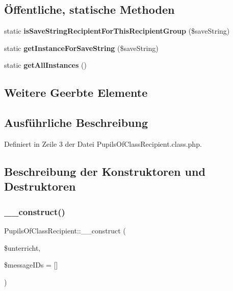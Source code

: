 \subsection*{Öffentliche, statische Methoden}
\begin{DoxyCompactItemize}
\item 
\mbox{\label{class_pupils_of_class_recipient_ac2c80b847ff2d2d83e6e86a42657c5c5}} 
static {\bfseries is\+Save\+String\+Recipient\+For\+This\+Recipient\+Group} (\$save\+String)
\item 
\mbox{\label{class_pupils_of_class_recipient_a70c289886a562779a58fe30073057821}} 
static {\bfseries get\+Instance\+For\+Save\+String} (\$save\+String)
\item 
\mbox{\label{class_pupils_of_class_recipient_a4021c58ee0419c037de108ea415a2cef}} 
static {\bfseries get\+All\+Instances} ()
\end{DoxyCompactItemize}
\subsection*{Weitere Geerbte Elemente}


\subsection{Ausführliche Beschreibung}


Definiert in Zeile 3 der Datei Pupils\+Of\+Class\+Recipient.\+class.\+php.



\subsection{Beschreibung der Konstruktoren und Destruktoren}
\mbox{\label{class_pupils_of_class_recipient_a46ee50b00da193e1a20ed36d226703af}} 
\subsubsection{\texorpdfstring{\+\_\+\+\_\+construct()}{\_\_construct()}}
{\footnotesize\ttfamily Pupils\+Of\+Class\+Recipient\+::\+\_\+\+\_\+construct (\begin{DoxyParamCaption}\item[{}]{\$unterricht,  }\item[{}]{\$message\+I\+Ds = {\ttfamily \mbox{[}\mbox{]}} }\end{DoxyParamCaption})}


